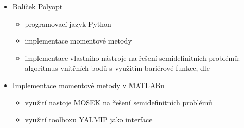 \documentclass[cmpiitalkstyle, 22pt]{cmptalk}
\begin{document}



\begin{cmptalkslide}[Implementace]
  \begin{itemize}
    \item Balíček Polyopt
    \begin{itemize}
      \item programovací jazyk Python
      \item implementace momentové metody
      \item implementace vlastního nástroje na řešení semidefinitních problémů: algoritmus vnitřních bodů s využitím bariérové funkce, dle \cite{Nesterov-2004}
    \end{itemize}
    \item Implementace momentové metody v MATLABu
    \begin{itemize}
      \item využití nastoje MOSEK \cite{mosek} na řešení semidefinitních problémů
      \item využití toolboxu YALMIP \cite{Yalmip} jako interface
    \end{itemize}
  \end{itemize}


\end{cmptalkslide}
\end{document}
